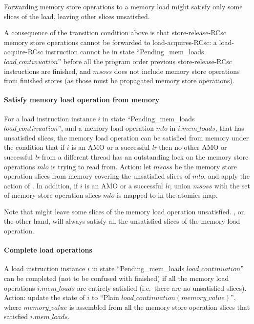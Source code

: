 \begin{commentary}
Forwarding memory store operations to a memory load might satisfy only some slices of the load, leaving other slices unsatisfied.

A consequence of the transition condition above is that store-release-RCsc memory store operations cannot be forwarded to load-acquires-RCsc:
a load-acquire-RCsc instruction cannot be in state ``{\sc Pending\_mem\_loads} $load\_continuation$'' before all the program order previous store-release-RCsc instructions are finished, and $msoss$ does not include memory store operations from finished stores (as those must be propagated memory store operations).
\end{commentary}


\paragraph{Satisfy memory load operation from memory}\label{omm:thread:sat_from_mem}
For a load instruction instance $i$ in state ``{\sc Pending\_mem\_loads} $load\_continuation$'', and a memory load operation $mlo$ in $i.mem\_loads$, that has unsatisfied slices, the memory load operation can be satisfied from memory under the condition that if $i$ is an AMO or a successful {\em lr} then no other AMO or successful {\em lr} from a different thread has an outstanding lock on the memory store operations $mlo$ is trying to read from.
Action: let $msoss$ be the memory store operation slices from memory covering the unsatisfied slices of $mlo$, and apply the action of .
In addition, if $i$ is an AMO or a successful {\em lr}, union $msoss$ with the set of memory store operation slices $mlo$ is mapped to in the atomics map.

\begin{commentary}
Note that  might leave some slices of the memory load operation unsatisfied.
, on the other hand, will always satisfy all the unsatisfied slices of the memory load operation.
\end{commentary}


\paragraph{Complete load operations}\label{omm:thread:complete_loads}
A load instruction instance $i$ in state ``{\sc Pending\_mem\_loads} $load\_continuation$'' can be completed (not to be confused with finished) if all the memory load operations $i.mem\_loads$ are entirely satisfied (i.e.~there are no unsatisfied slices).
Action: update the state of $i$ to ``{\sc Plain} $load\_continuation(memory\_value)$'', where $memory\_value$ is assembled from all the memory store operation slices that satisfied $i.mem\_loads$.


